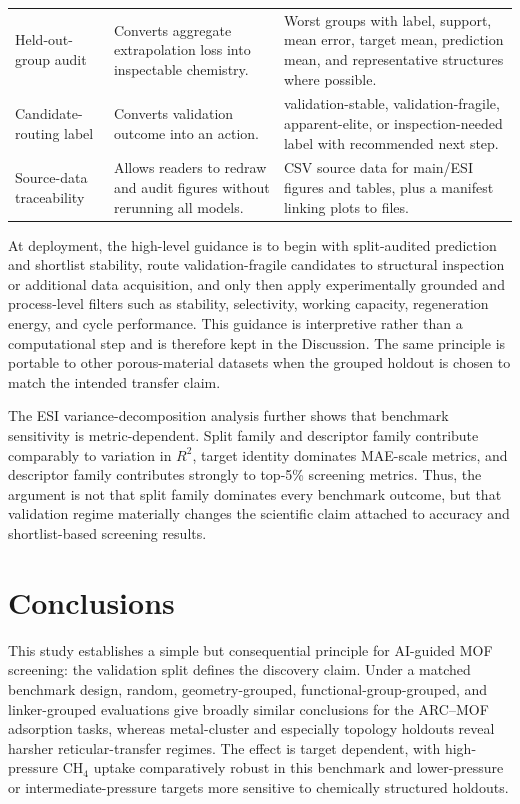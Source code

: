 \documentclass[11pt,a4paper]{article}
\begin{document}
\begin{table}[H]
\begin{tabular}{p{}p{}p{}}
Held-out-group audit & Converts aggregate extrapolation loss into inspectable chemistry. & Worst groups with label, support, mean error, target mean, prediction mean, and representative structures where possible. \\
Candidate-routing label & Converts validation outcome into an action. & validation-stable, validation-fragile, apparent-elite, or inspection-needed label with recommended next step. \\
Source-data traceability & Allows readers to redraw and audit figures without rerunning all models. & CSV source data for main/ESI figures and tables, plus a manifest linking plots to files. \\
\bottomrule
\end{tabular}
\end{table}

At deployment, the high-level guidance is to begin with split-audited prediction and shortlist stability, route validation-fragile candidates to structural inspection or additional data acquisition, and only then apply experimentally grounded and process-level filters such as stability, selectivity, working capacity, regeneration energy, and cycle performance. This guidance is interpretive rather than a computational step and is therefore kept in the Discussion. The same principle is portable to other porous-material datasets when the grouped holdout is chosen to match the intended transfer claim.

The ESI variance-decomposition analysis further shows that benchmark sensitivity is metric-dependent. Split family and descriptor family contribute comparably to variation in $R^2$, target identity dominates MAE-scale metrics, and descriptor family contributes strongly to top-5\% screening metrics. Thus, the argument is not that split family dominates every benchmark outcome, but that validation regime materially changes the scientific claim attached to accuracy and shortlist-based screening results.

\section*{Conclusions}
This study establishes a simple but consequential principle for AI-guided MOF screening: the validation split defines the discovery claim. Under a matched benchmark design, random, geometry-grouped, functional-group-grouped, and linker-grouped evaluations give broadly similar conclusions for the ARC--MOF adsorption tasks, whereas metal-cluster and especially topology holdouts reveal harsher reticular-transfer regimes. The effect is target dependent, with high-pressure CH$_4$ uptake comparatively robust in this benchmark and lower-pressure or intermediate-pressure targets more sensitive to chemically structured holdouts.
\end{document}
